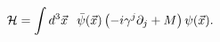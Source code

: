 \begin{equation}
\label{hamiltonianF}
{\cal H} = \int d^3{\vec x} 
\hspace{0.1in}
\bar{\psi}({\vec x})\left( -i \gamma^{j} 
\partial_{j} + M \right)\psi({\vec x}).
\end{equation}

